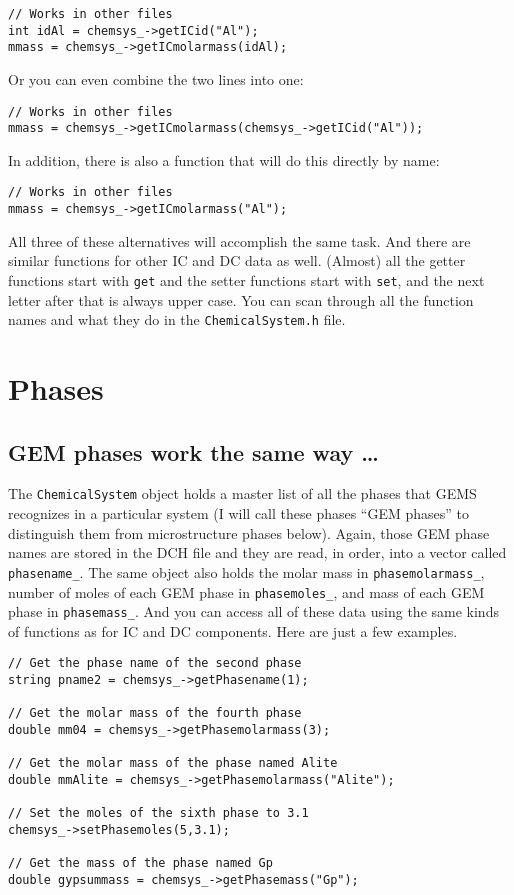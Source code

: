 \documentclass{article}
\begin{document}
\begin{lstlisting}
// Works in other files
int idAl = chemsys_->getICid("Al");
mmass = chemsys_->getICmolarmass(idAl);
\end{lstlisting}
Or you can even combine the two lines into one:
\begin{lstlisting}
// Works in other files
mmass = chemsys_->getICmolarmass(chemsys_->getICid("Al"));
\end{lstlisting}
In addition, there is also a function that will do this directly by name:
\begin{lstlisting}
// Works in other files
mmass = chemsys_->getICmolarmass("Al");
\end{lstlisting}

All three of these alternatives will accomplish the same task.  And there are 
similar functions for other IC and DC data as well.  (Almost) all the getter
functions start with \verb!get! and the setter functions start with \verb!set!,
and the next letter after that is always upper case.  You can scan through
all the function names and what they do in the \verb!ChemicalSystem.h! file.

\section{Phases}
\subsection{GEM phases work the same way \ldots}
The \verb!ChemicalSystem! object holds a master list of all the phases
that GEMS recognizes in a particular system (I will call these phases ``GEM phases'' to
distinguish them from microstructure phases below).  Again, those GEM phase names
are stored in the DCH file and they are read, in order, into a vector
called \verb!phasename_!.  The same object also holds the molar mass
in \verb!phasemolarmass_!, number of moles of each GEM phase in
\verb!phasemoles_!, and mass of each GEM phase in \verb!phasemass_!.
And you can access all of these data using the same kinds
of functions as for IC and DC components.  Here are just a few examples.

\begin{lstlisting}
// Get the phase name of the second phase
string pname2 = chemsys_->getPhasename(1);

// Get the molar mass of the fourth phase
double mm04 = chemsys_->getPhasemolarmass(3);

// Get the molar mass of the phase named Alite
double mmAlite = chemsys_->getPhasemolarmass("Alite");

// Set the moles of the sixth phase to 3.1
chemsys_->setPhasemoles(5,3.1);

// Get the mass of the phase named Gp
double gypsummass = chemsys_->getPhasemass("Gp");

\end{lstlisting}
\end{document}
